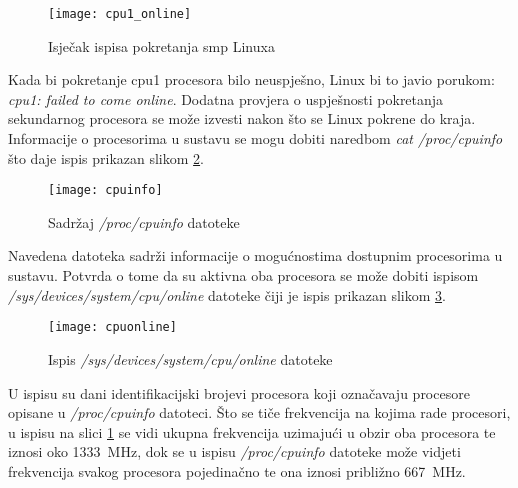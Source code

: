 \documentclass[times, utf8, diplomski, numeric]{fer}
\begin{document}
\begin{figure}[H]
  \centering
  \texttt{[image: cpu1\_online]}
  \caption{Isječak ispisa pokretanja \gls{smp} Linuxa}
  \label{smp_boot_secondary}
\end{figure}
Kada bi pokretanje \gls{cpu}1 procesora bilo neuspješno, Linux bi to javio porukom: \textit{\gls{cpu}1: failed to come online}.
Dodatna provjera o uspješnosti pokretanja sekundarnog procesora se može izvesti nakon što se Linux pokrene do kraja.
Informacije o procesorima u sustavu se mogu dobiti naredbom \textit{cat /proc/cpuinfo} što daje ispis prikazan slikom
\ref{cpuinfo}.
\begin{figure}[H]
  \centering
  \texttt{[image: cpuinfo]}
  \caption{Sadržaj \textit{/proc/cpuinfo} datoteke}
  \label{cpuinfo}
\end{figure}
Navedena datoteka sadrži informacije o mogućnostima dostupnim procesorima u sustavu. Potvrda o tome da su aktivna oba
procesora se može dobiti ispisom \textit{/sys/devices/system/cpu/online} datoteke čiji je ispis prikazan slikom \ref{cpuonline}.
\begin{figure}[H]
  \centering
  \texttt{[image: cpuonline]}
  \caption{Ispis \textit{/sys/devices/system/cpu/online} datoteke}
  \label{cpuonline}
\end{figure}
U ispisu su dani identifikacijski brojevi procesora koji označavaju procesore opisane u \textit{/proc/cpuinfo} datoteci.
Što se tiče frekvencija na kojima rade procesori, u ispisu na slici \ref{smp_boot_secondary} se vidi ukupna frekvencija
uzimajući u obzir oba procesora te iznosi oko 1333~MHz, dok se u ispisu \textit{/proc/cpuinfo} datoteke može vidjeti
frekvencija svakog procesora pojedinačno te ona iznosi približno 667~MHz.
\end{document}
